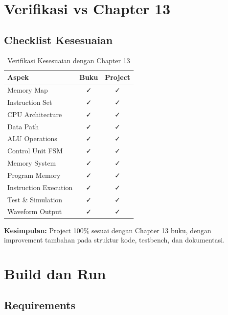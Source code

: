 \documentclass[12pt,a4paper]{report}
\begin{document}
\chapter{Verifikasi vs Chapter 13}

\section{Checklist Kesesuaian}

\begin{table}[H]
  \centering
  \begin{tabular}{|l|c|c|}
    \hline
    \textbf{Aspek} & \textbf{Buku} & \textbf{Project} \\
    \hline
    Memory Map & ✓ & ✓ \\
    Instruction Set & ✓ & ✓ \\
    CPU Architecture & ✓ & ✓ \\
    Data Path & ✓ & ✓ \\
    ALU Operations & ✓ & ✓ \\
    Control Unit FSM & ✓ & ✓ \\
    Memory System & ✓ & ✓ \\
    Program Memory & ✓ & ✓ \\
    Instruction Execution & ✓ & ✓ \\
    Test \& Simulation & ✓ & ✓ \\
    Waveform Output & ✓ & ✓ \\
    \hline
  \end{tabular}
  \caption{Verifikasi Kesesuaian dengan Chapter 13}
\end{table}

\textbf{Kesimpulan:} Project 100\% sesuai dengan Chapter 13 buku, dengan improvement tambahan pada struktur kode, testbench, dan dokumentasi.

\chapter{Build dan Run}

\section{Requirements}
\end{document}
